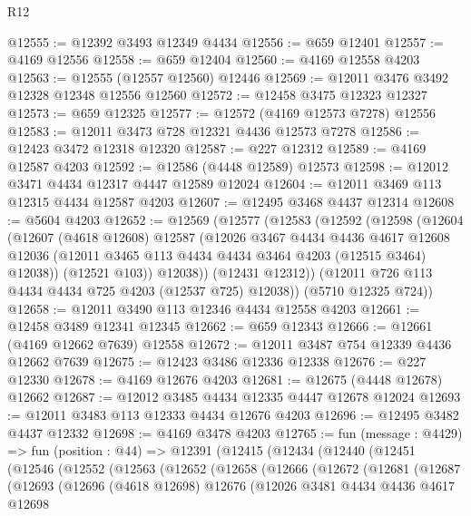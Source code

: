 \begin{lexlean}{R12}
\begin{coremodule}
@12555 := @12392 @3493 @12349 @4434
@12556 := @659 @12401
@12557 := @4169 @12556
@12558 := @659 @12404
@12560 := @4169 @12558 @4203
@12563 := @12555 (@12557 @12560) @12446
@12569 := @12011 @3476 @3492 @12328 @12348 @12556 @12560
@12572 := @12458 @3475 @12323 @12327
@12573 := @659 @12325
@12577 := @12572 (@4169 @12573 @7278) @12556
@12583 := @12011 @3473 @728 @12321 @4436 @12573 @7278
@12586 := @12423 @3472 @12318 @12320
@12587 := @227 @12312
@12589 := @4169 @12587 @4203
@12592 := @12586 (@4448 @12589) @12573
@12598 := @12012 @3471 @4434 @12317 @4447 @12589 @12024
@12604 := @12011 @3469 @113 @12315 @4434 @12587 @4203
@12607 := @12495 @3468 @4437 @12314
@12608 := @5604 @4203
@12652 := @12569
    (@12577
      (@12583
        (@12592
          (@12598
            (@12604
              (@12607
                (@4618 @12608)
                @12587
                (@12026
                  @3467
                  @4434
                  @4436
                  @4617
                  @12608
                  @12036
                  (@12011 @3465 @113 @4434 @4434 @3464 @4203 (@12515 @3464) @12038))
                (@12521 @103))
              @12038))
          (@12431 @12312))
        (@12011 @726 @113 @4434 @4434 @725 @4203 (@12537 @725) @12038))
      (@5710 @12325 @724))
@12658 := @12011 @3490 @113 @12346 @4434 @12558 @4203
@12661 := @12458 @3489 @12341 @12345
@12662 := @659 @12343
@12666 := @12661 (@4169 @12662 @7639) @12558
@12672 := @12011 @3487 @754 @12339 @4436 @12662 @7639
@12675 := @12423 @3486 @12336 @12338
@12676 := @227 @12330
@12678 := @4169 @12676 @4203
@12681 := @12675 (@4448 @12678) @12662
@12687 := @12012 @3485 @4434 @12335 @4447 @12678 @12024
@12693 := @12011 @3483 @113 @12333 @4434 @12676 @4203
@12696 := @12495 @3482 @4437 @12332
@12698 := @4169 @3478 @4203
@12765 := fun (message : @4429) =>
  fun (position : @44) =>
  @12391
    (@12415
      (@12434
        (@12440
          (@12451
            (@12546
              (@12552
                (@12563
                  (@12652
                    (@12658
                      (@12666
                        (@12672
                          (@12681
                            (@12687
                              (@12693
                                (@12696
                                  (@4618 @12698)
                                  @12676
                                  (@12026
                                    @3481
                                    @4434
                                    @4436
                                    @4617
                                    @12698

\end{coremodule}
\end{lexlean}
